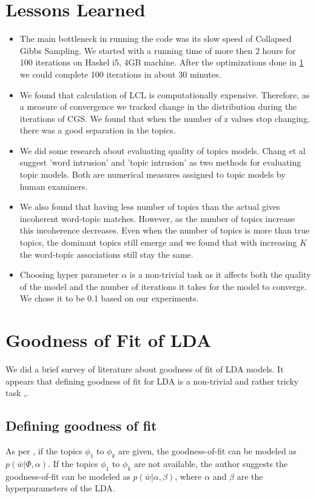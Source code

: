 \documentclass[11pt,a4paper,oneside]{article}
\begin{document}
\section{Lessons Learned}
\label{Lessons}
\begin{itemize}
\item The main bottleneck in running the code was its slow speed of Collapsed Gibbs Sampling. We started with a running time of more then 2 hours for 100 iterations on Haskel i5, 4GB machine. After the optimizations done in \ref{Lessons} we could complete 100 iterations in about 30 minutes.
\item We found that calculation of LCL is computationally expensive. Therefore, as a measure of convergence we tracked change in the distribution during the iterations of CGS. We found that when the number of z values stop changing, there was a good separation in the topics.
\item We did some research about evaluating quality of topics models. Chang et al\cite{chang} suggest 'word intrusion' and 'topic intrusion' as two methods for evaluating topic models. Both are numerical measures assigned to topic models by human examiners.
\item We also found that having less number of topics than the actual gives incoherent word-topic matches. However, as the number of topics increase this incoherence decreases. Even when the number of topics is more than true topics, the dominant topics still emerge and we found that with increasing $K$ the word-topic associations still stay the same.
\item Choosing hyper parameter $\alpha$ is a non-trivial task as it affects both the quality of the model and the number of iterations it takes for the model to converge. We chose it to be 0.1 based on our experiments.
\end{itemize}

\section{Goodness of Fit of LDA}
We did a brief survey of literature about goodness of fit of LDA models. It appears that defining goodness of fit for LDA is a non-trivial and rather tricky task \cite{heinrich},\cite{nguyen}.

\subsection{Defining goodness of fit}
As per \cite{nguyen}, if the topics $\phi_{1}$ to $\phi_{k}$ are given, the goodness-of-fit can be modeled as $p(\bar{w}| \Phi,\alpha )$. If the topics $\phi_{1}$ to $\phi_{k}$ are not available, the author suggests the goodness-of-fit can be modeled as $p(\bar{w}| \alpha,\beta )$, where $\alpha$ and $\beta$ are the hyperparameters of the LDA.
\end{document}
